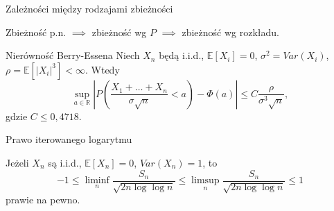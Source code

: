 \documentclass[avery5371,grid,frame]{flashcards}
\begin{document}
\begin{flashcard}[Twierdzenie]{Zależności między rodzajami zbieżności}

\smallskip
Zbieżność p.n. $\implies$ zbieżność wg $P$ $\implies$ zbieżność wg rozkładu.
\end{flashcard}

\begin{flashcard}[Twierdzenie]{Nierówność Berry-Essena}
	\smallskip
	Niech $X_n$ będą i.i.d., $\mathbb{E}[X_i] = 0$, $\sigma^2 = Var(X_i)$, $\rho = \mathbb{E}[|X_i|^3] < \infty$. Wtedy
	$$ \sup_{a \in \mathbb{R}} \left | P\left(\frac{X_1 + \dots + X_n}{\sigma \sqrt{n}} < a \right ) - \Phi(a) \right | \leq C \frac{\rho}{\sigma^3 \sqrt{n}},$$ gdzie $C \leq 0,4718$.
\end{flashcard}

\begin{flashcard}[Twierdzenie]{Prawo iterowanego logarytmu}

\smallskip
Jeżeli $X_n$ są i.i.d., $\mathbb{E}[X_n] = 0$, $Var(X_n) = 1$, to
$$ -1 \leq \liminf_n \frac{S_n}{\sqrt{2n \log \log n}} \leq  \limsup_n \frac{S_n}{\sqrt{2n \log \log n}} \leq 1$$ prawie na pewno.
\end{flashcard}
\end{document}
